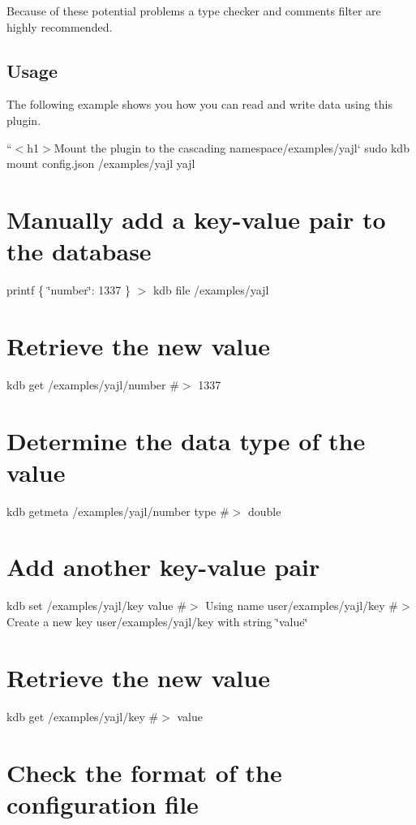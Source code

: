 Because of these potential problems a type checker and comments filter are highly recommended.

\subsection*{Usage}

The following example shows you how you can read and write data using this plugin.

``{\ttfamily  $<$h1$>$Mount the plugin to the cascading namespace}/examples/yajl` sudo kdb mount config.\+json /examples/yajl yajl

\section*{Manually add a key-\/value pair to the database}

printf \textquotesingle{}\{ \char`\"{}number\char`\"{}\+: 1337 \}\textquotesingle{} $>$ {\ttfamily kdb file /examples/yajl}

\section*{Retrieve the new value}

kdb get /examples/yajl/number \#$>$ 1337

\section*{Determine the data type of the value}

kdb getmeta /examples/yajl/number type \#$>$ double

\section*{Add another key-\/value pair}

kdb set /examples/yajl/key value \#$>$ Using name user/examples/yajl/key \#$>$ Create a new key user/examples/yajl/key with string \char`\"{}value\char`\"{}

\section*{Retrieve the new value}

kdb get /examples/yajl/key \#$>$ value

\section*{Check the format of the configuration file}

